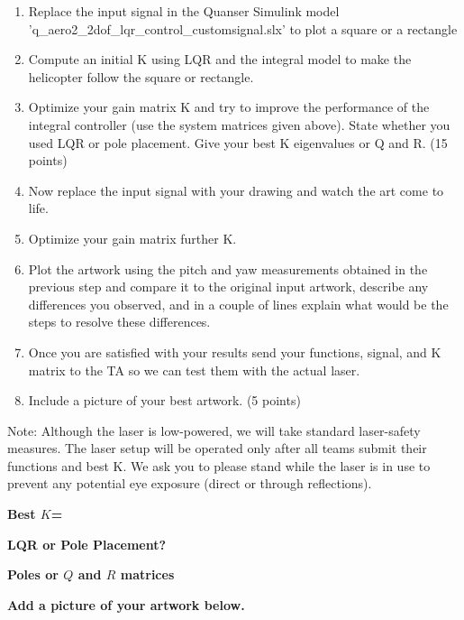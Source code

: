\documentclass[11pt]{article}
\begin{document}
\begin{enumerate}
    \item Replace the input signal in the Quanser Simulink model 'q\_aero2\_2dof\_lqr\_control\_customsignal.slx' to plot a square or a rectangle

    \item Compute an initial K using LQR and the integral model to make the helicopter follow the square or rectangle.

     \item Optimize your gain matrix K and try to improve the performance of the integral controller (use the system matrices given above).  State whether you used LQR or pole placement. Give your best K eigenvalues or Q and R. (15 points)
    
    \item Now replace the input signal with your drawing and watch the art come to life. 

    \item Optimize your gain matrix further K.    
    
    \item Plot the artwork using the pitch and yaw measurements obtained in the previous step and compare it to the original input artwork, describe any differences you observed, and in a couple of lines explain what would be the steps to resolve these differences.

    \item Once you are satisfied with your results send your functions, signal, and K matrix to the TA so we can test them with the actual laser.
   
    \item Include a picture of your best artwork. (5 points)
\end{enumerate}


Note: Although the laser is low-powered, we will take standard laser-safety measures. The laser setup will be operated only after all teams submit their functions and best K. We ask you to please stand while the laser is in use to prevent any potential eye exposure (direct or through reflections).

\vspace{1cm}

 \textbf{Best \( K \)=}\\
\vspace{1cm} %

\textbf{LQR or Pole Placement?}\\

\vspace{0.5 cm} %

\textbf{Poles or \( Q \) and \( R \) matrices\\}

\vspace{2cm} %


\clearpage


\textbf{Add a picture of your artwork below.}\\

  
\end{document}
